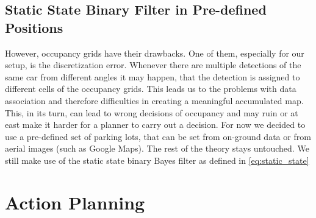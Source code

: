     \subsection{Static State Binary Filter in Pre-defined Positions} %
    \label{sub:static_state_binary_filter_in_pre_defined_positions}
        However, occupancy grids have their drawbacks. One of them, especially for our setup, is the discretization error. Whenever there are multiple detections of the same car from different angles it may happen, that the detection is assigned to different cells of the occupancy grids. This leads us to the problems with data association and therefore difficulties in creating a meaningful accumulated map. This, in its turn, can lead to wrong decisions of occupancy and may ruin or at east make it harder for a planner to carry out a decision.
        For now we decided to use a pre-defined set of parking lots, that can be set from on-ground data or from aerial images (such as Google Maps). The rest of the theory stays untouched. We still make use of the static state binary Bayes filter as defined in \ref{eq:static_state}

\section{Action Planning} %
\label{sec:action_planning}

